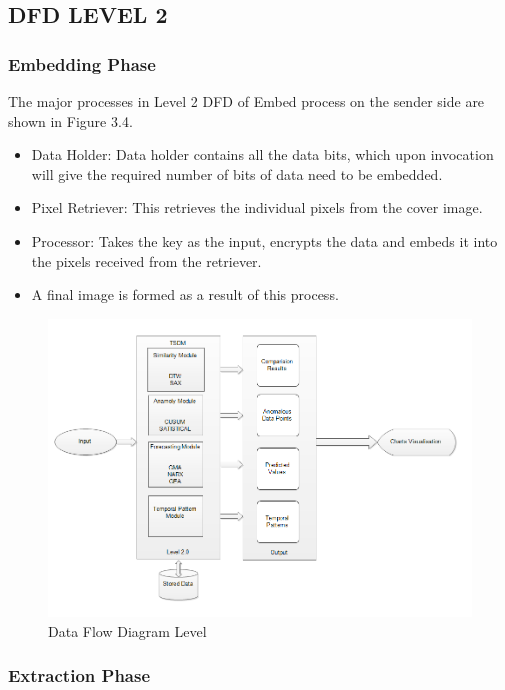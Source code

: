 \documentclass[12pt]{report}
\begin{document}
\pagebreak
\subsection{DFD LEVEL 2}
\subsubsection{Embedding Phase}
The major processes in Level 2 DFD of Embed process on the sender side are shown in Figure 3.4.
\begin{itemize}
\item Data Holder: Data holder contains all the data bits, which upon invocation will give the required number of bits of data need to be embedded.
\item Pixel Retriever: This retrieves the individual pixels from the cover image. 
\item Processor: Takes the key as the input, encrypts the data and embeds it into the pixels received from the retriever. 
\item A final image is formed as a result of this process.
\end{itemize}
\begin{figure}[h!]
	\centering
		\includegraphics[scale=0.7]{screenshots/dfd_2.png}
		\caption{Data Flow Diagram Level }
\end{figure}
\pagebreak
\subsubsection{Extraction Phase}
\end{document}
